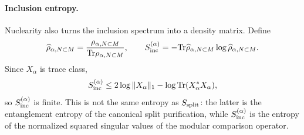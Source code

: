 \documentclass[a4paper,11pt]{article}
\theoremstyle{definition}
\newcommand{\Tr}{\text{Tr}}
\begin{document}
\paragraph{Inclusion entropy.}
Nuclearity also turns the inclusion spectrum into a density matrix. Define
\begin{equation}
    \widehat\rho_{\alpha,N\subset M}
    =\frac{\rho_{\alpha,N\subset M}}
           {\Tr\rho_{\alpha,N\subset M}},
    \qquad
    S_{\rm inc}^{(\alpha)}
    =-\Tr\widehat\rho_{\alpha,N\subset M}
          \log\widehat\rho_{\alpha,N\subset M}.
    \label{eq:rho-inclusion-normalized}
\end{equation}
Since $X_\alpha$ is trace class,
\begin{equation}
    S_{\rm inc}^{(\alpha)}
    \le
    2\log\|X_\alpha\|_1
    -\log\Tr(X_\alpha^*X_\alpha),
    \label{eq:Sinclusion-nuclearity-bound}
\end{equation}
so $S_{\rm inc}^{(\alpha)}$ is finite. This is not the same entropy as
$S_{\rm split}$: the latter is the entanglement entropy of the canonical split
purification, while $S_{\rm inc}^{(\alpha)}$ is the entropy of the normalized
squared singular values of the modular comparison operator.
\end{document}

